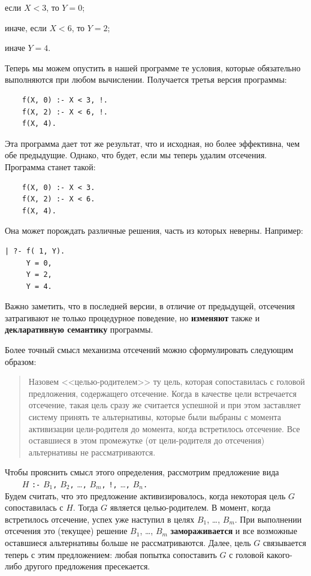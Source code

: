 \documentclass[12pt, openany, twoside]{book} %
\begin{document}
если $X < 3$, то $Y = 0$;

иначе, если $X < 6$, то $Y = 2$;

иначе $Y = 4$.

Теперь мы можем опустить в нашей программе те условия, которые обязательно выполняются при любом вычислении. Получается третья версия программы:
{\tt \begin{verbatim}
    f(X, 0) :- X < 3, !.
    f(X, 2) :- X < 6, !.
    f(X, 4).
\end{verbatim}}

\noindent Эта программа дает тот же результат, что и исходная, но более эффективна, чем обе предыдущие. Однако, что будет, если мы теперь удалим отсечения. Программа станет такой:
{\tt \begin{verbatim}
    f(X, 0) :- X < 3.
    f(X, 2) :- X < 6.
    f(X, 4).
\end{verbatim}}
\noindent Она может порождать различные решения, часть из которых неверны. Например:

{\tt \begin{verbatim}
| ?- f( 1, Y).
     Y = 0,
     Y = 2,
     Y = 4.
 \end{verbatim}}

Важно заметить, что в последней версии, в отличие от предыдущей, отсечения затрагивают не только процедурное поведение, но {\bf изменяют} также и {\bf декларативную семантику} программы.

Более точный смысл механизма отсечений можно сформулировать следующим образом:
\begin{quote}
Назовем <<целью-родителем>> ту цель, которая сопоставилась с головой предложения, содержащего отсечение. Когда в качестве цели встречается отсечение, такая цель сразу же считается успешной и при этом заставляет систему принять те альтернативы, которые были выбраны с момента активизации цели-родителя до момента, когда встретилось отсечение. Все оставшиеся в этом промежутке (от цели-родителя до отсечения) альтернативы не рассматриваются.
\end{quote}

Чтобы прояснить смысл этого определения, рассмотрим предложение вида\\[1ex]
\verb|    |$H$ {\tt :-} $B_1${\tt,} $B_2${\tt,} \ldots {\tt ,} $B_m${\tt,}
    {\tt !,} \ldots {\tt ,} $B_n${\tt.}\\[-0.5ex]

\noindent Будем считать, что это предложение активизировалось, когда некоторая цель $G$ сопоставилась с $H$. Тогда $G$ является целью-родителем. В момент, когда встретилось отсечение, успех уже наступил в целях $B_1$, \ldots, $B_m$. При выполнении отсечения это (текущее) решение $B_1$, \ldots, $B_m$ {\bf замораживается} и все возможные оставшиеся альтернативы больше не рассматриваются. Далее, цель $G$ связывается теперь с этим предложением: любая попытка сопоставить $G$ с головой какого-либо другого предложения пресекается.
\end{document}

